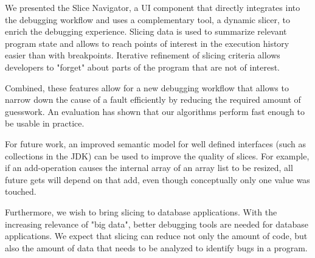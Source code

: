 ﻿\documentclass[
      english,
			conference,
      ]{IEEEtran}
\begin{document}
We presented the Slice Navigator, a UI component that directly integrates into the debugging workflow and uses a complementary tool, a dynamic slicer, to enrich the debugging experience.
Slicing data is used to summarize relevant program state and allows to reach points of interest in the execution history easier than with breakpoints.
Iterative refinement of slicing criteria allows developers to "forget" about parts of the program that are not of interest.

Combined, these features allow for a new debugging workflow that allows to narrow down the cause of a fault efficiently by reducing the required amount of guesswork.
An evaluation has shown that our algorithms perform fast enough to be usable in practice.

For future work, an improved semantic model for well defined interfaces (such as collections in the JDK) can be used to improve the quality of slices. 
For example, if an add-operation causes the internal array of an array list to be resized, all future gets will depend on that add, even though conceptually only one value was touched.

Furthermore, we wish to bring slicing to database applications.
With the increasing relevance of "big data", better debugging tools are needed for database applications.
We expect that slicing can reduce not only the amount of code, but also the amount of data that needs to be analyzed to identify bugs in a program.


\printbibliography
\end{document}
